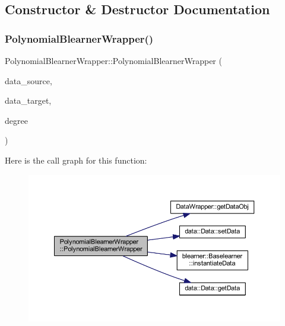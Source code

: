 \subsection{Constructor \& Destructor Documentation}
\mbox{\label{class_polynomial_blearner_wrapper_a07ad5a828b4a46bb2f6a2a6fc56b8f1a}} 
\subsubsection{\texorpdfstring{Polynomial\+Blearner\+Wrapper()}{PolynomialBlearnerWrapper()}}
{\footnotesize\ttfamily Polynomial\+Blearner\+Wrapper\+::\+Polynomial\+Blearner\+Wrapper (\begin{DoxyParamCaption}\item[{\mbox{\hyperlink{class_data_wrapper}{Data\+Wrapper}} \&}]{data\+\_\+source,  }\item[{\mbox{\hyperlink{class_data_wrapper}{Data\+Wrapper}} \&}]{data\+\_\+target,  }\item[{unsigned int}]{degree }\end{DoxyParamCaption})\hspace{0.3cm}{\ttfamily [inline]}}

Here is the call graph for this function\+:\nopagebreak
\begin{figure}[H]
\begin{center}
\leavevmode
\includegraphics[width=350pt]{class_polynomial_blearner_wrapper_a07ad5a828b4a46bb2f6a2a6fc56b8f1a_cgraph}
\end{center}
\end{figure}



